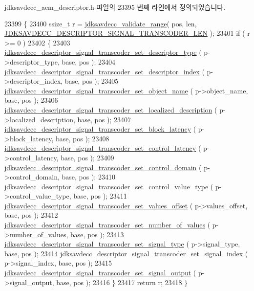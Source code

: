 jdksavdecc\+\_\+aem\+\_\+descriptor.\+h 파일의 23395 번째 라인에서 정의되었습니다.


\begin{DoxyCode}
23399 \{
23400     ssize\_t r = \hyperlink{group__util_ga9c02bdfe76c69163647c3196db7a73a1}{jdksavdecc\_validate\_range}( pos, len, 
      \hyperlink{group__descriptor__transcoder_gad7874b3634edd5a908909a5659dd899c}{JDKSAVDECC\_DESCRIPTOR\_SIGNAL\_TRANSCODER\_LEN} );
23401     \textcolor{keywordflow}{if} ( r >= 0 )
23402     \{
23403         \hyperlink{group__descriptor__transcoder_ga3a49a893b88a2bd389d9056bfb4f4637}{jdksavdecc\_descriptor\_signal\_transcoder\_set\_descriptor\_type}
      ( p->descriptor\_type, base, pos );
23404         \hyperlink{group__descriptor__transcoder_ga40ad1db774d31dc33d468fea89de38c7}{jdksavdecc\_descriptor\_signal\_transcoder\_set\_descriptor\_index}
      ( p->descriptor\_index, base, pos );
23405         \hyperlink{group__descriptor__transcoder_gafbe8f98985c2ef583819b330cc0bd44e}{jdksavdecc\_descriptor\_signal\_transcoder\_set\_object\_name}
      ( p->object\_name, base, pos );
23406         \hyperlink{group__descriptor__transcoder_gaf0a1a3c7bab2f8cc0cb5fd1e2094553a}{jdksavdecc\_descriptor\_signal\_transcoder\_set\_localized\_description}
      ( p->localized\_description, base, pos );
23407         \hyperlink{group__descriptor__transcoder_ga74c6c70c19aec0d001be07c4ea5e559f}{jdksavdecc\_descriptor\_signal\_transcoder\_set\_block\_latency}
      ( p->block\_latency, base, pos );
23408         \hyperlink{group__descriptor__transcoder_gad57618363cabb19525d09165a26752bd}{jdksavdecc\_descriptor\_signal\_transcoder\_set\_control\_latency}
      ( p->control\_latency, base, pos );
23409         \hyperlink{group__descriptor__transcoder_gac6a523bb0bec32d4938b03ca997a22f5}{jdksavdecc\_descriptor\_signal\_transcoder\_set\_control\_domain}
      ( p->control\_domain, base, pos );
23410         \hyperlink{group__descriptor__transcoder_gaa1f95177969d3783a181bd98ba0fa8cb}{jdksavdecc\_descriptor\_signal\_transcoder\_set\_control\_value\_type}
      ( p->control\_value\_type, base, pos );
23411         \hyperlink{group__descriptor__transcoder_gaafdad525bb50c88f8b2458da77e8b494}{jdksavdecc\_descriptor\_signal\_transcoder\_set\_values\_offset}
      ( p->values\_offset, base, pos );
23412         \hyperlink{group__descriptor__transcoder_ga82080622534169e1d12393fa48a33144}{jdksavdecc\_descriptor\_signal\_transcoder\_set\_number\_of\_values}
      ( p->number\_of\_values, base, pos );
23413         \hyperlink{group__descriptor__transcoder_ga874b1fc40a31a461420da305b1fb9891}{jdksavdecc\_descriptor\_signal\_transcoder\_set\_signal\_type}
      ( p->signal\_type, base, pos );
23414         \hyperlink{group__descriptor__transcoder_ga428536a59991110555fd673e39e1293f}{jdksavdecc\_descriptor\_signal\_transcoder\_set\_signal\_index}
      ( p->signal\_index, base, pos );
23415         \hyperlink{group__descriptor__transcoder_gab2aea88bd4e0fe9467fc74e3a4454fd1}{jdksavdecc\_descriptor\_signal\_transcoder\_set\_signal\_output}
      ( p->signal\_output, base, pos );
23416     \}
23417     \textcolor{keywordflow}{return} r;
23418 \}
\end{DoxyCode}


